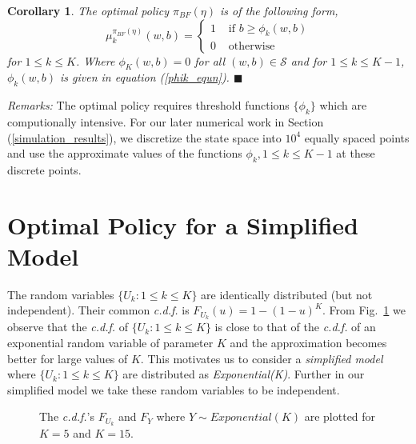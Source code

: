 \documentclass[onecolumn]{IEEEtran}
\newtheorem{corollary}[theorem]{Corollary}
\begin{document}
\begin{corollary}
  The optimal policy $\pi_{BF}(\eta)$ is of the following form,
\begin{equation}
\label{optpolicy_equn}
\mu^{\pi_{BF}(\eta)}_k(w,b)=\left\{\begin{array}{ll}
                               	1&\mbox{ if }b\ge \phi_k(w,b)\\
                               	0&\mbox{ otherwise }	\end{array}\right.
\end{equation}
for $1\le k\le K$. Where $\phi_K(w,b)=0$ for all $(w,b)\in\mathcal{S}$ and for $1\le k\le K-1$, $\phi_k(w,b)$ is given in equation (\ref{phik_equn}).
\hfill $\blacksquare$
\end{corollary}

\noindent
\emph{Remarks:} The optimal policy requires threshold functions $\{\phi_k\}$ which are
computionally intensive. For our later numerical work in Section
(\ref{simulation_results}), we discretize the state space into
${10}^4$ equally spaced points and use the approximate values of the
functions $\phi_k, 1\le k\le K-1$ at these discrete points.

\section{Optimal Policy for a Simplified Model}
\label{suboptimal_policy}
The random variables $\{U_k:1\le k\le K\}$ are identically distributed
\cite[Chapter 2]{orderstatistics} (but not independent). Their common
\emph{c.d.f.} is $F_{U_k}(u)=1-(1-u)^{K}$.  From Fig.~\ref{cdf_figu} we
observe that the \emph{c.d.f.} of $\{U_k:1\le k\le K\}$ is close to that of
the \emph{c.d.f.} of an exponential random variable of parameter $K$ and the
approximation becomes better for large values of $K$. This motivates
us to consider a \emph{simplified model} where $\{U_k:1\le k\le K\}$
are distributed as \emph{Exponential(K)}. Further in our simplified
model we take these random variables to be independent.
\begin{figure}[ht]
\centering
{}
\caption{The \emph{c.d.f.}'s  $F_{U_k}$ and $F_Y$ where $Y\sim Exponential(K)$ are plotted for  $K=5$ and  $K=15$.\label{cdf_figu}}
\end{figure}
\end{document}
